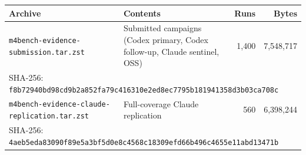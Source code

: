 \begin{tabular}{p{}p{}rr}
\toprule
Archive & Contents & Runs & Bytes \\
\midrule
\texttt{m4bench-evidence-}\newline\texttt{submission.tar.zst} & \raggedright Submitted campaigns (Codex primary, Codex follow-up, Claude sentinel, OSS) & 1,400 & 7,548,717 \\
\multicolumn{4}{l}{SHA-256: \texttt{f8b72940bd98cd9b2a852fa79c416310e2ed8ec7795b181941358d3b03ca708c}} \\
\midrule
\texttt{m4bench-evidence-}\newline\texttt{claude-replication.tar.zst} & \raggedright Full-coverage Claude replication & 560 & 6,398,244 \\
\multicolumn{4}{l}{SHA-256: \texttt{4aeb5eda83090f89e5a3bf5d0e8c4568c18309efd66b496c4655e11abd13471b}} \\
\bottomrule
\end{tabular}
